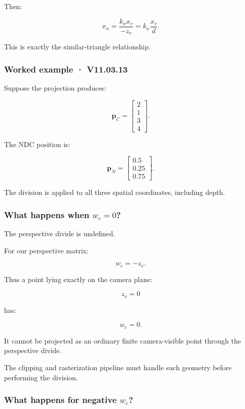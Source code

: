 Then:

\[
 x_n= \frac{k_xx_v}{-z_v} = k_x\frac{x_v}{d}.
\]

This is exactly the similar-triangle relationship.

\subsubsection{Worked example · V11.03.13}\label{worked-example-v11.03.13}

Suppose the projection produces:

\[
 \mathbf p_C= \begin{bmatrix} 2\\1\\3\\4 \end{bmatrix}.
\]

The NDC position is:

\[
 \boxed{ \mathbf p_N= \begin{bmatrix} 0.5\\0.25\\0.75 \end{bmatrix} }.
\]

The division is applied to all three spatial coordinates, including depth.

\subsubsection{\texorpdfstring{What happens when \(w_c=0\)?}{What happens when w\_c=0?}}\label{what-happens-when-w_c0}

The perspective divide is undefined.

For our perspective matrix:

\[
 w_c=-z_v.
\]

Thus a point lying exactly on the camera plane:

\[
 z_v=0
\]

has:

\[
 w_c=0.
\]

It cannot be projected as an ordinary finite camera-visible point through the perspective divide.

The clipping and rasterization pipeline must handle such geometry before performing the division.

\subsubsection{\texorpdfstring{What happens for negative \(w_c\)?}{What happens for negative w\_c?}}\label{what-happens-for-negative-w_c}


